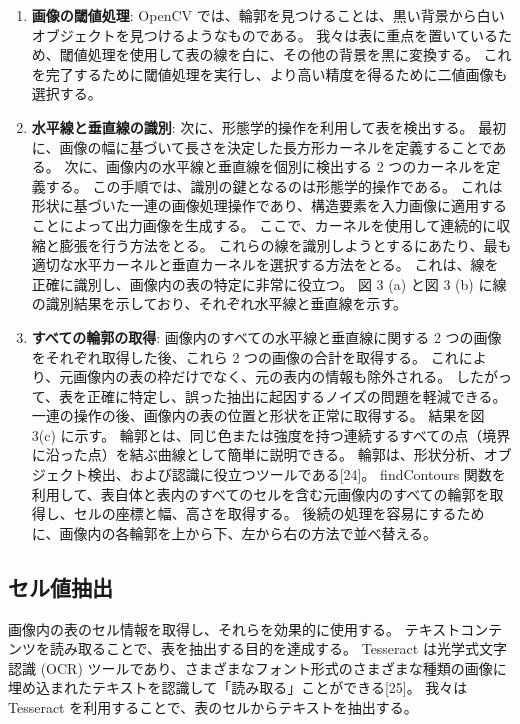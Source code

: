 \documentclass[uplatex, twocolumn,10pt]{jsarticle}
\begin{document}
\begin{enumerate}
    \item \textbf{画像の閾値処理}: 
    OpenCV では、輪郭を見つけることは、黒い背景から白いオブジェクトを見つけるようなものである。
    我々は表に重点を置いているため、閾値処理を使用して表の線を白に、その他の背景を黒に変換する。
    これを完了するために閾値処理を実行し、より高い精度を得るために二値画像も選択する。
    \item \textbf{水平線と垂直線の識別}:
    次に、形態学的操作を利用して表を検出する。
    最初に、画像の幅に基づいて長さを決定した長方形カーネルを定義することである。
    次に、画像内の水平線と垂直線を個別に検出する 2 つのカーネルを定義する。
    この手順では、識別の鍵となるのは形態学的操作である。
    これは形状に基づいた一連の画像処理操作であり、構造要素を入力画像に適用することによって出力画像を生成する。
    ここで、カーネルを使用して連続的に収縮と膨張を行う方法をとる。
    これらの線を識別しようとするにあたり、最も適切な水平カーネルと垂直カーネルを選択する方法をとる。
    これは、線を正確に識別し、画像内の表の特定に非常に役立つ。
    図 3 (a) と図 3 (b) に線の識別結果を示しており、それぞれ水平線と垂直線を示す。
    \item \textbf{すべての輪郭の取得}:
    画像内のすべての水平線と垂直線に関する 2 つの画像をそれぞれ取得した後、これら 2 つの画像の合計を取得する。
    これにより、元画像内の表の枠だけでなく、元の表内の情報も除外される。
    したがって、表を正確に特定し、誤った抽出に起因するノイズの問題を軽減できる。
    一連の操作の後、画像内の表の位置と形状を正常に取得する。
    結果を図 3(c) に示す。
    輪郭とは、同じ色または強度を持つ連続するすべての点（境界に沿った点）を結ぶ曲線として簡単に説明できる。
    輪郭は、形状分析、オブジェクト検出、および認識に役立つツールである[24]。
    findContours 関数を利用して、表自体と表内のすべてのセルを含む元画像内のすべての輪郭を取得し、セルの座標と幅、高さを取得する。
    後続の処理を容易にするために、画像内の各輪郭を上から下、左から右の方法で並べ替える。
\end{enumerate}


\subsection{セル値抽出}
画像内の表のセル情報を取得し、それらを効果的に使用する。
テキストコンテンツを読み取ることで、表を抽出する目的を達成する。
Tesseract は光学式文字認識 (OCR) ツールであり、さまざまなフォント形式のさまざまな種類の画像に埋め込まれたテキストを認識して「読み取る」ことができる[25]。
我々は Tesseract を利用することで、表のセルからテキストを抽出する。
\end{document}
